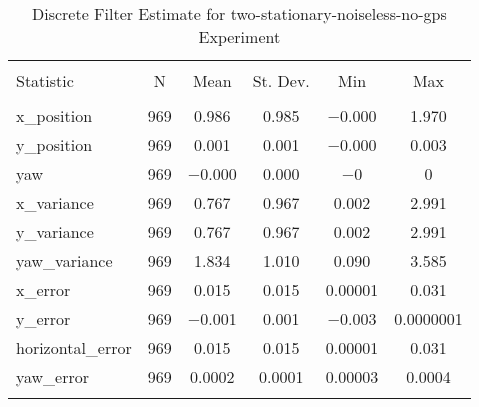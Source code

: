 
\begin{table}[h] \centering 
  \caption{Discrete Filter Estimate for two-stationary-noiseless-no-gps Experiment} 
  \label{tab:two_stationary_noiseless_no_gps_discrete_summary} 
\begin{tabular}{@{\extracolsep{5pt}}lccccc} 
\\[-1.8ex]\hline 
\hline \\[-1.8ex] 
Statistic & \multicolumn{1}{c}{N} & \multicolumn{1}{c}{Mean} & \multicolumn{1}{c}{St. Dev.} & \multicolumn{1}{c}{Min} & \multicolumn{1}{c}{Max} \\ 
\hline \\[-1.8ex] 
x\_position & 969 & 0.986 & 0.985 & $-$0.000 & 1.970 \\ 
y\_position & 969 & 0.001 & 0.001 & $-$0.000 & 0.003 \\ 
yaw & 969 & $-$0.000 & 0.000 & $-$0 & 0 \\ 
x\_variance & 969 & 0.767 & 0.967 & 0.002 & 2.991 \\ 
y\_variance & 969 & 0.767 & 0.967 & 0.002 & 2.991 \\ 
yaw\_variance & 969 & 1.834 & 1.010 & 0.090 & 3.585 \\ 
x\_error & 969 & 0.015 & 0.015 & 0.00001 & 0.031 \\ 
y\_error & 969 & $-$0.001 & 0.001 & $-$0.003 & 0.0000001 \\ 
horizontal\_error & 969 & 0.015 & 0.015 & 0.00001 & 0.031 \\ 
yaw\_error & 969 & 0.0002 & 0.0001 & 0.00003 & 0.0004 \\ 
\hline \\[-1.8ex] 
\end{tabular} 
\end{table} 
